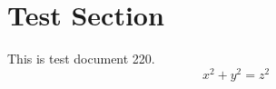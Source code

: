 \documentclass{article}
\begin{document}
\section{Test Section}
This is test document 220.
\begin{equation}
x^2 + y^2 = z^2
\end{equation}
\end{document}

